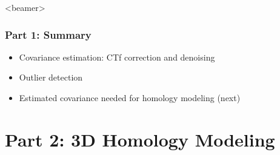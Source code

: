 \documentclass{beamer}
\newcommand\blfootnote[1]{%
  \begingroup
  \renewcommand\thefootnote{}\footnote{#1}%
  \addtocounter{footnote}{-1}%
  \endgroup
}
\begin{document}
%

\begin{frame}<beamer>
\frametitle{Part 1: Summary}
\begin{itemize}
\item Covariance estimation: CTf correction and denoising
\item Outlier detection
\item Estimated covariance needed for homology modeling (next)
\end{itemize}
\end{frame}


\section{Part 2: 3D Homology Modeling}
\end{document}

